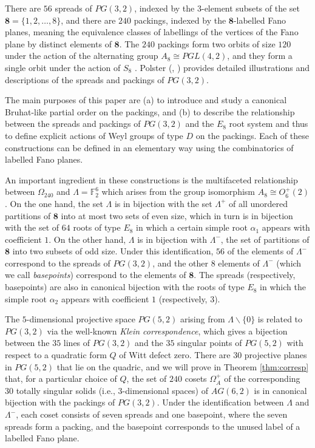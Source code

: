 \documentclass{amsart}
\theoremstyle{plain}
\theoremstyle{definition}
\theoremstyle{remark}
\numberwithin{equation}{section}
\newcommand{\al}{\alpha}
\newcommand{\F}{{\mathbb F}}
\newcommand{\eight}{{\mathbf 8}}
\newcommand{\qpx}{\Omega_{240}}
\newcommand{\qp}{\Omega}
\newcommand{\lamp}{\Lambda^+}
\newcommand{\lamm}{\Lambda^-}
\newcommand{\vsix}{\Lambda}
\begin{document}
There are $56$ spreads of $PG(3, 2)$, indexed by the 3-element subsets of the set $\eight = \{1, 2, \ldots, 8\}$, and 
there are $240$ packings, indexed by the $\eight$-labelled Fano planes, meaning the equivalence classes of labellings of
the vertices of the Fano plane by distinct elements of $\eight$. The $240$ packings form two orbits of size $120$ under 
the action of the alternating group $A_8 \cong PGL(4,2)$, and they form a single orbit under the action of $S_8$ 
\cite[Theorem 17.5.6 (ii)]{hirschfeld85}. Polster (\cite[\S5.1.3]{polster98}, \cite{polster99}) provides detailed 
illustrations and descriptions of the spreads and packings of $PG(3, 2)$. 

The main purposes of this paper are (a) to introduce and study a canonical Bruhat-like partial order on the packings,
and (b) to describe the relationship between the spreads and packings of $PG(3, 2)$ and the $E_8$ root system and 
thus to define explicit actions of Weyl groups of type $D$ on the packings. Each of these constructions can be
defined in an elementary way using the combinatorics of labelled Fano planes.

An important ingredient in these constructions is the multifaceted relationship between $\qpx$ and $\vsix = \F_2^6$
 which arises from the group isomorphism $A_8 \cong O_6^+(2)$. On the one 
hand, the set $\vsix$ is in bijection with the set $\lamp$ of all unordered partitions of $\eight$ into at 
most two sets of even size, which in turn is in bijection with the set of $64$ roots of type $E_8$ in which a certain 
simple root $\al_1$ appears with coefficient $1$. On the other hand, $\vsix$ is in bijection with $\lamm$, 
the set of partitions of $\eight$ into two subsets of odd size. Under this identification, $56$ of the elements of 
$\lamm$ correspond to the spreads of $PG(3, 2)$, and the other $8$ elements of $\lamm$ (which we call {\it basepoints}) 
correspond to the elements of $\eight$. The spreads (respectively, basepoints) are also in canonical bijection 
with the roots of type $E_8$ in which the simple root $\alpha_2$ appears with coefficient $1$ (respectively, $3$).

The $5$-dimensional projective space $PG(5, 2)$ arising from $\vsix\backslash \{0\}$ is related to $PG(3, 2)$ via 
the well-known {\it Klein correspondence}, which gives a bijection between the $35$ lines of $PG(3, 2)$ and the $35$ 
singular points of $PG(5, 2)$ with respect to a quadratic form $Q$ of Witt defect zero. There are $30$ projective 
planes in $PG(5, 2)$ that lie on the quadric, and we will prove in Theorem \ref{thm:corresp} that, for a particular 
choice of $Q$, the set of $240$ cosets $\qp^+_A$ of the corresponding $30$ totally singular solids (i.e., $3$-dimensional 
spaces) of $AG(6, 2)$ is in canonical bijection with the packings of $PG(3, 2)$. Under the identification between 
$\vsix$ and $\lamm$, each coset consists of seven spreads and one basepoint, where the seven spreads form a packing, 
and the basepoint corresponds to the unused label of a labelled Fano plane.
\end{document}
